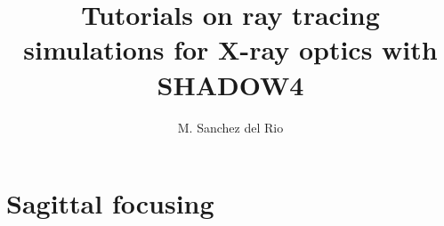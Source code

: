 \documentclass{ol-softwaremanual}
\title{Tutorials on ray tracing simulations for X-ray optics with SHADOW4}
\author{M. Sanchez del Rio}
\begin{document}
\maketitle

\tableofcontents

\newpage
\section{Sagittal focusing}


\end{document}
